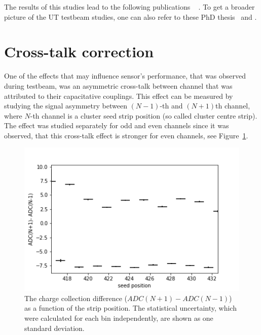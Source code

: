 The results of this studies lead to the following publications ~\cite{tb1}  \cite{tb2} \cite{tb3}. To get a broader picture of the UT testbeam studies, one can also refer to these PhD thesis~\cite{Federica} and \cite{Kelsey}.

\section{Cross-talk correction}
\label{sec:cross_talk}
One of the effects that may influence sensor's performance, that was observed during testbeam, was an asymmetric cross-talk between channel that was attributed to their capacitative couplings. This effect can be measured by studying the signal asymmetry between $(N-1)$-th and $(N+1)$th channel, where $N$-th channel is a cluster seed strip position (so called cluster centre strip). The effect was studied separately for odd and even channels since it was observed, that this cross-talk effect is stronger for even channels, see Figure~\ref{fig:charge asymmetry profile}.  


\begin{figure}[htb]
\centering
\includegraphics[scale=0.5]{figures/eta/profile_0deg.png}
\caption{The charge collection difference ($ADC(N+1) - ADC(N-1)$) as a function of the strip position. The statistical uncertainty, which were calculated for each bin independently, are shown as one standard deviation. }
\label{fig:charge asymmetry profile}
\end{figure}

